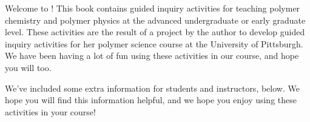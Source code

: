Welcome to \thetitle!  This book contains guided inquiry activities for teaching polymer chemistry and polymer physics at the advanced undergraduate or early graduate level.  These activities are the result of a project by the author to develop guided inquiry activities for her polymer science course at the University of Pittsburgh.  We have been having a lot of fun using these activities in our course, and hope you will too.  


We've included some extra information for students and instructors, below.  We hope you will find this information helpful, and we hope you enjoy using these activities in your course!